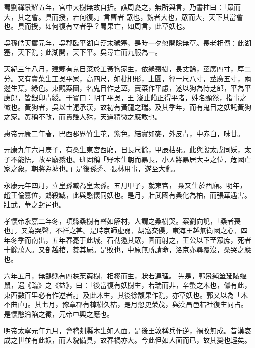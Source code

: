 \begin{pinyinscope}
 蜀劉禪景耀五年，宮中大樹無故自折。譙周憂之，無所與言，乃書柱曰：「眾而大，其之會。具而授，若何復。」言曹者
 眾也，魏者大也，眾而大，天下其當會也。具而授，如何復有立者乎？蜀果亡，如周言，此草妖也。



 吳孫皓天璽元年，吳郡臨平湖自漢末穢塞，是時一夕忽開除無草。長老相傳：此湖塞，天下亂；此湖開，天下平。吳尋亡而九服為一。



 天紀三年八月，建鄴有鬼目菜於工黃狗家生，依緣棗樹，長丈餘，莖廣四寸，厚二分。又有賣菜生工吳平家，高四尺，如枇杷形，上圓，徑一尺八寸，莖廣五寸，兩邊生葉，綠色。東觀案圖，名鬼目作芝萆，賣菜作平慮，遂以狗為侍芝郎，平為平慮郎，皆銀印青綬。干寶曰：明年平吳，王
 浚止船正得平渚，姓名顯然，指事之徵也。黃狗者，吳以土運承漢，故初有黃龍之瑞。及其季年，而有鬼目之妖託黃狗之家。黃稱不改，而貴賤大殊，天道精微之應敢也。



 惠帝元康二年春，巴西郡界竹生花，紫色，結實如麥，外皮青，中赤白，味甘。



 元康九年六月庚子，有桑生東宮西廂，日長尺餘，甲辰枯死。此與殷太戊同妖，太子不能悟，故至廢戮也。班固稱「野木生朝而暴長，小人將暴居大臣之位，危國亡家之象，朝將為墟也。」是後孫秀、張林用事，遂至大亂。



 永康元年四月，立皇孫臧為皇太孫。五月甲子，就東宮，
 桑又生於西廂。明年，趙王倫篡位，鴆殺臧，此與愍懷同妖也。是月，壯武國有桑化為柏，而張華遇害。壯武，華之封邑也。



 孝懷帝永嘉二年冬，項縣桑樹有聲如解材，人謂之桑樹哭。案劉向說，「桑者喪也」，又為哭聲，不祥之甚。是時京師虛弱，胡寇交侵，東海王越無衛國之心，四年冬季而南出，五年春薨于此城。石勒邀其眾，圍而射之，王公以下至眾庶，死者十餘萬人。又剖越棺，焚其屍。是敗也，中原無所請命，洛京亦尋覆沒，桑哭之應也。



 六年五月，無錫縣有四株茱萸樹，相樛而生，狀若連理。
 先是，郭景純筮延陵蝘鼠，遇《臨》之《益》，曰：「後當復有妖樹生，若瑞而非，辛螫之木也，儻有此，東西數百里必有作逆者。」及此木生，其後徐馥果作亂，亦草妖也。郭又以為「木不曲直」。其七月，豫章郡有樟樹久枯，是月忽更榮茂，與漢昌邑枯社復生同占。是懷愍淪陷之徵，元帝中興之應也。



 明帝太寧元年九月，會稽剡縣木生如人面。是後王敦稱兵作逆，禍敗無成。昔漢哀成之世並有此妖，而人貌備具，故春禍亦大。今此但如人面而已，故其變也輕矣。




\end{pinyinscope}
